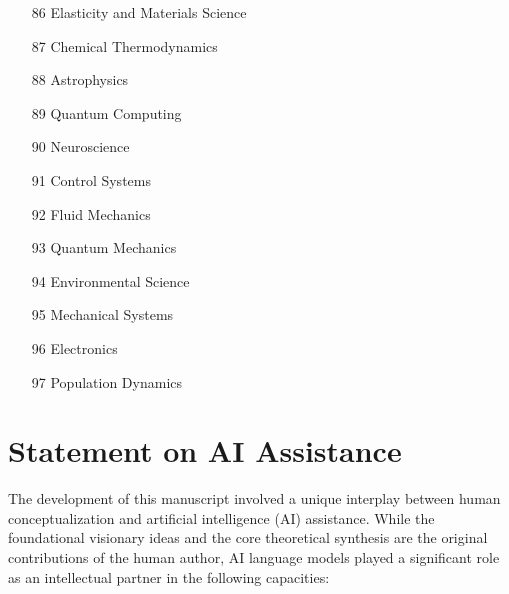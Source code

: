 \documentclass[11pt,a4paper]{article}
\begin{document}
\begin{itemize}
    \item[86] Elasticity and Materials Science 
    \item[87] Chemical Thermodynamics  %
    \item[88] Astrophysics  %
    \item[89] Quantum Computing  %
    \item[90] Neuroscience  %
    \item[91] Control Systems 
    \item[92] Fluid Mechanics  %
    \item[93] Quantum Mechanics  %
    \item[94] Environmental Science  %
    \item[95] Mechanical Systems 
    \item[96] Electronics 
    \item[97] Population Dynamics 
\end{itemize}





\section*{Statement on AI Assistance}
\label{sec:ai_statement}

The development of this manuscript involved a unique interplay between human conceptualization and artificial intelligence (AI) assistance. While the foundational visionary ideas and the core theoretical synthesis are the original contributions of the human author, AI language models played a significant role as an intellectual partner in the following capacities:
\end{document}
